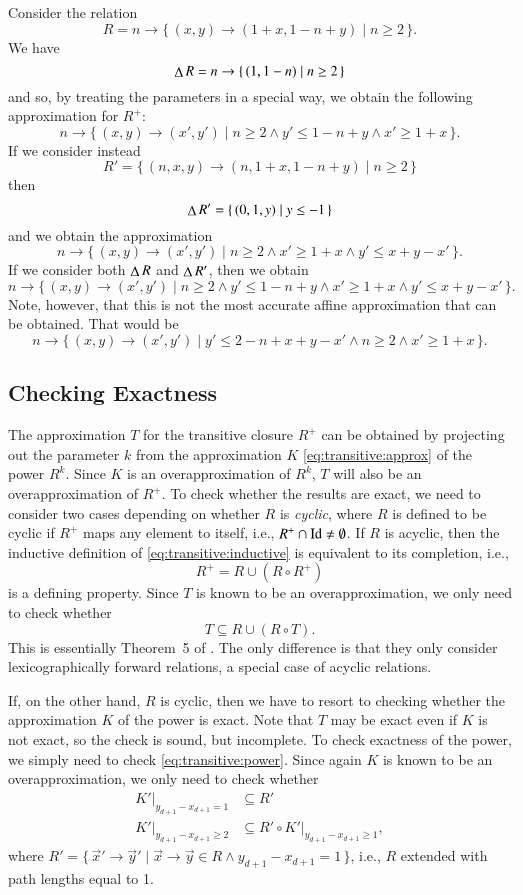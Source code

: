 \begin{example}
Consider the relation
$$
R = n \to \{\, (x, y) \to (1 + x, 1 - n + y) \mid n \ge 2 \,\}
.
$$
We have
$$
\mathop{\Delta}\nolimits R = n \to \{\, (1, 1 - n) \mid n \ge 2 \,\}
$$
and so, by treating the parameters in a special way, we obtain
the following approximation for $R^+$:
$$
n \to \{\, (x, y) \to (x', y') \mid n \ge 2 \wedge y' \le 1 - n + y \wedge x' \ge 1 + x \,\}
.
$$
If we consider instead
$$
R' = \{\, (n, x, y) \to (n, 1 + x, 1 - n + y) \mid n \ge 2 \,\}
$$
then
$$
\mathop{\Delta}\nolimits R' = \{\, (0, 1, y) \mid y \le -1 \,\}
$$
and we obtain the approximation
$$
n \to \{\, (x, y) \to (x', y') \mid n \ge 2 \wedge x' \ge 1 + x \wedge y' \le x + y - x' \,\}
.
$$
If we consider both $\mathop{\Delta}\nolimits R$ and $\mathop{\Delta}\nolimits R'$, then we obtain
$$
n \to \{\, (x, y) \to (x', y') \mid n \ge 2 \wedge y' \le 1 - n + y \wedge x' \ge 1 + x \wedge y' \le x + y - x' \,\}
.
$$
Note, however, that this is not the most accurate affine approximation that
can be obtained.  That would be
$$
n \to \{\, (x, y) \to (x', y') \mid y' \le 2 - n + x + y - x' \wedge n \ge 2 \wedge x' \ge 1 + x \,\}
.
$$
\end{example}

\subsection{Checking Exactness}

The approximation $T$ for the transitive closure $R^+$ can be obtained
by projecting out the parameter $k$ from the approximation $K$
\eqref{eq:transitive:approx} of the power $R^k$.
Since $K$ is an overapproximation of $R^k$, $T$ will also be an
overapproximation of $R^+$.
To check whether the results are exact, we need to consider two
cases depending on whether $R$ is {\em cyclic}, where $R$ is defined
to be cyclic if $R^+$ maps any element to itself, i.e.,
$R^+ \cap \mathop{\rm Id}\nolimits \ne \emptyset$.
If $R$ is acyclic, then the inductive definition of
\eqref{eq:transitive:inductive} is equivalent to its completion,
i.e.,
$$
R^+ = R \cup \left(R \circ R^+\right)
$$
is a defining property.
Since $T$ is known to be an overapproximation, we only need to check
whether
$$
T \subseteq R \cup \left(R \circ T\right)
.
$$
This is essentially Theorem~5 of \textcite{Kelly1996closure}.
The only difference is that they only consider lexicographically
forward relations, a special case of acyclic relations.

If, on the other hand, $R$ is cyclic, then we have to resort
to checking whether the approximation $K$ of the power is exact.
Note that $T$ may be exact even if $K$ is not exact, so the check
is sound, but incomplete.
To check exactness of the power, we simply need to check
\eqref{eq:transitive:power}.  Since again $K$ is known
to be an overapproximation, we only need to check whether
$$
\begin{aligned}
K'|_{y_{d+1} - x_{d+1} = 1} & \subseteq R'
\\
K'|_{y_{d+1} - x_{d+1} \ge 2} & \subseteq R' \circ K'|_{y_{d+1} - x_{d+1} \ge 1}
,
\end{aligned}
$$
where $R' = \{\, \vec x' \to \vec y' \mid \vec x \to \vec y \in R
\wedge y_{d+1} - x_{d+1} = 1\,\}$, i.e., $R$ extended with path
lengths equal to 1.

